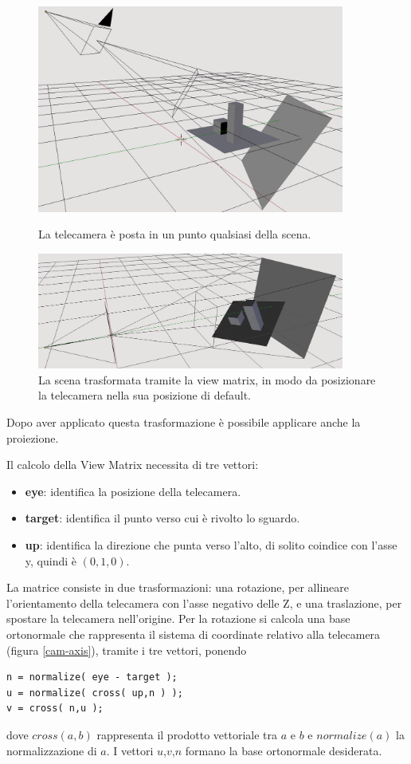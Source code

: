 \begin{figure}[htbp]
\centering
\includegraphics[width=0.9\textwidth]{images/frustum/view-before4-white2.png}
\caption{La telecamera è posta in un punto qualsiasi della scena.\label{view1}}
\includegraphics[width=0.9\textwidth]{images/frustum/view-after4-white2.png}
\caption{La scena trasformata tramite la view matrix, in modo da posizionare la telecamera nella sua posizione di default.\label{view2}}
\end{figure}


Dopo aver applicato questa trasformazione è possibile applicare anche la proiezione.

Il calcolo della View Matrix necessita di tre vettori:
\begin{itemize}
\item \textbf{eye}: identifica la posizione della telecamera.
\item \textbf{target}: identifica il punto verso cui è rivolto lo sguardo.
\item \textbf{up}: identifica la direzione che punta verso l'alto, di solito coindice con l'asse y, quindi è $(0, 1, 0)$.
\end{itemize}

La matrice consiste in due trasformazioni: una rotazione, per allineare l'orientamento della telecamera con l'asse negativo delle Z, e una traslazione, per spostare la telecamera nell'origine.
Per la rotazione si calcola una base ortonormale che rappresenta il sistema di coordinate relativo alla telecamera (figura \ref{cam-axis}), tramite i tre vettori, ponendo
\begin{lstlisting}
n = normalize( eye - target );
u = normalize( cross( up,n ) );
v = cross( n,u );
\end{lstlisting}
dove $cross(a,b)$ rappresenta il prodotto vettoriale tra $a$ e $b$ e $normalize(a)$ la normalizzazione di $a$. I vettori $u$,$v$,$n$ formano la base ortonormale desiderata.

